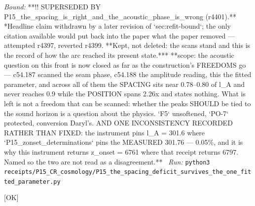 \begin{description}
 \emph{Bound:} **!! SUPERSEDED BY P15\_the\_spacing\_is\_right\_and\_the\_acoustic\_phase\_is\_wrong (r4401).** *Headline claim withdrawn by a later revision of `sec:refit-bound`; the only citation available would put back into the paper what the paper removed --- attempted r4397, reverted r4399. **Kept, not deleted: the scans stand and this is the record of how the arc reached its present state.*** **scope: the acoustic question on this front is now closed as far as the construction's FREEDOMS go --- c54.187 scanned the seam phase, c54.188 the amplitude reading, this the fitted parameter, and across all of them the SPACING sits near 0.78--0.80 of l\_A and never reaches 0.9 while the POSITION spans 2.26x and states nothing. What is left is not a freedom that can be scanned: whether the peaks SHOULD be tied to the sound horizon is a question about the physics. `F5` unsoftened, `PO-7` protected, conversion Daryl's. AND ONE INCONSISTENCY RECORDED RATHER THAN FIXED: the instrument pins l\_A = 301.6 where `P15\_zonset\_determinations` pins the MEASURED 301.76 --- 0.05\%, and it is why this instrument returns z\_onset = 6761 where that receipt returns 6797. Named so the two are not read as a disagreement.**
\ \emph{Run:} \texttt{python3 receipts/P15\_CR\_cosmology/P15\_the\_spacing\_deficit\_survives\_the\_one\_fitted\_parameter.py}
\item[\rcptlabel{P15_the_spacing_is_right_and_the_acoustic_phase_is_wrong}{P15R95}\textbf{P15R95}\quad\texttt{P15\_the\_spacing\_is\_right\_and\_the\_acoustic\_phase\_is\_wrong}]\hfill\textsf{[OK]}\\

\end{description}
